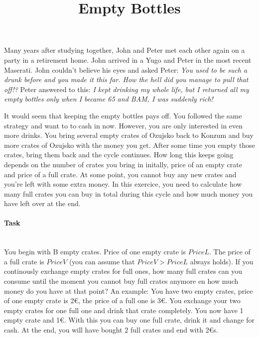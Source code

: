 \documentclass[10pt,a4paper]{article}
\begin{document}
\title{Empty Bottles}
\maketitle


Many years after studying together, John and Peter met each other again on a party in a retirement home. John arrived in a Yugo and Peter in the most recent Maserati. John couldn't believe his eyes and asked Peter: \textit{You used to be such a drunk before and you made it this far. How the hell did you manage to pull that off!?} Peter answered to this: \textit{I kept drinking my whole life, but I returned all my empty bottles only when I became 65 and BAM, I was suddenly rich!}

It would seem that keeping the empty bottles pays off. You followed the same strategy and want to to cash in now. However, you are only interested in even more drinks. You bring several empty crates of Ozujsko back to Konzum and buy more crates of Ozujsko with the money you get. After some time you empty those crates, bring them back and the cycle continues. How long this keeps going depends on the number of crates you bring in initally, price of an empty crate and price of a full crate. At some point, you cannot buy any new crates and you're left with some extra money. In this exercice, you need to calculate how many full crates you can buy in total during this cycle and how much money you have left over at the end.

\paragraph{Task\\ \\}

You begin with B empty crates. Price of one empty crate is $PriceL$. The price of a full crate is $PriceV$ (you can assume that $PriceV > PriceL$ always holds). If you continously exchange empty crates for full ones, how many full crates can you consume until the moment you cannot buy full crates anymore en how much money do you have at that point?
An example: You have two empty crates, price of one empty crate is 2\euro{}, the price of a full one is 3\euro{}. You exchange your two empty crates for one full one and drink that crate completely. You now have 1 empty crate and 1\euro{}. With this you can buy one full crate, drink it and change for cash. At the end, you will have bought 2 full crates and end with 2\euro{}s.
\end{document}
